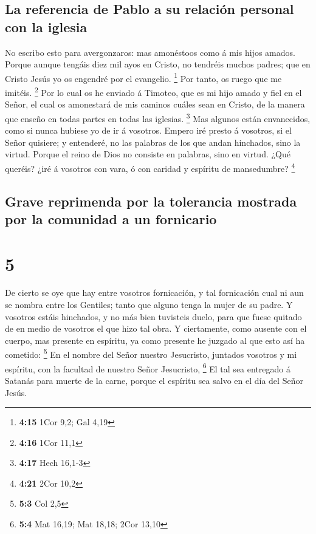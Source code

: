 \hypertarget{la-referencia-de-pablo-a-su-relaciuxf3n-personal-con-la-iglesia}{%
\subsection{La referencia de Pablo a su relación personal con la
iglesia}\label{la-referencia-de-pablo-a-su-relaciuxf3n-personal-con-la-iglesia}}

 No escribo esto para avergonzaros: mas amonéstoos como á
mis hijos amados.  Porque aunque tengáis diez mil ayos en
Cristo, no tendréis muchos padres; que en Cristo Jesús yo os engendré
por el evangelio. \footnote{\textbf{4:15} 1Cor 9,2; Gal 4,19}
 Por tanto, os ruego que me imitéis. \footnote{\textbf{4:16}
  1Cor 11,1}  Por lo cual os he enviado á Timoteo, que es
mi hijo amado y fiel en el Señor, el cual os amonestará de mis caminos
cuáles sean en Cristo, de la manera que enseño en todas partes en todas
las iglesias. \footnote{\textbf{4:17} Hech 16,1-3}  Mas
algunos están envanecidos, como si nunca hubiese yo de ir á vosotros.
 Empero iré presto á vosotros, si el Señor quisiere; y
entenderé, no las palabras de los que andan hinchados, sino la virtud.
 Porque el reino de Dios no consiste en palabras, sino en
virtud.  ¿Qué queréis? ¿iré á vosotros con vara, ó con
caridad y espíritu de mansedumbre? \footnote{\textbf{4:21} 2Cor 10,2}

\hypertarget{grave-reprimenda-por-la-tolerancia-mostrada-por-la-comunidad-a-un-fornicario}{%
\subsection{Grave reprimenda por la tolerancia mostrada por la comunidad
a un
fornicario}\label{grave-reprimenda-por-la-tolerancia-mostrada-por-la-comunidad-a-un-fornicario}}

\hypertarget{section-4}{%
\section{5}\label{section-4}}

 De cierto se oye que hay entre vosotros fornicación, y
tal fornicación cual ni aun se nombra entre los Gentiles; tanto que
alguno tenga la mujer de su padre.  Y vosotros estáis
hinchados, y no más bien tuvisteis duelo, para que fuese quitado de en
medio de vosotros el que hizo tal obra.  Y ciertamente,
como ausente con el cuerpo, mas presente en espíritu, ya como presente
he juzgado al que esto así ha cometido: \footnote{\textbf{5:3} Col 2,5}
 En el nombre del Señor nuestro Jesucristo, juntados
vosotros y mi espíritu, con la facultad de nuestro Señor Jesucristo,
\footnote{\textbf{5:4} Mat 16,19; Mat 18,18; 2Cor 13,10} 
El tal sea entregado á Satanás para muerte de la carne, porque el
espíritu sea salvo en el día del Señor Jesús.


